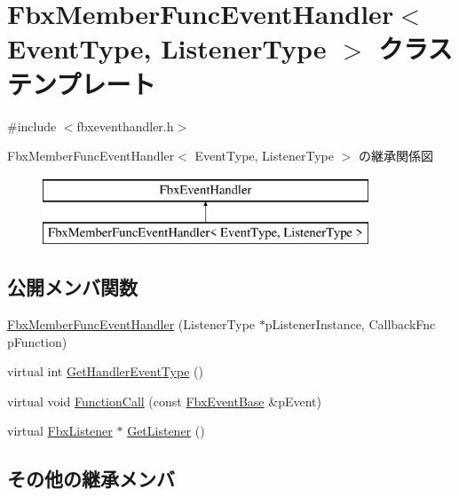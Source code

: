 \hypertarget{class_fbx_member_func_event_handler}{}\section{Fbx\+Member\+Func\+Event\+Handler$<$ Event\+Type, Listener\+Type $>$ クラステンプレート}
\label{class_fbx_member_func_event_handler}


{\ttfamily \#include $<$fbxeventhandler.\+h$>$}

Fbx\+Member\+Func\+Event\+Handler$<$ Event\+Type, Listener\+Type $>$ の継承関係図\begin{figure}[H]
\begin{center}
\leavevmode
\includegraphics[height=2.000000cm]{class_fbx_member_func_event_handler}
\end{center}
\end{figure}
\subsection*{公開メンバ関数}
\begin{DoxyCompactItemize}
\item 
\hyperlink{class_fbx_member_func_event_handler_aea54f8e7f5579f28f715c5a9b8e1e9d5}{Fbx\+Member\+Func\+Event\+Handler} (Listener\+Type $\ast$p\+Listener\+Instance, Callback\+Fnc p\+Function)
\item 
virtual int \hyperlink{class_fbx_member_func_event_handler_a57856423663f283503e6498a7eacb0b4}{Get\+Handler\+Event\+Type} ()
\item 
virtual void \hyperlink{class_fbx_member_func_event_handler_a4bcb037442927d480776bc2fb4b7bcd6}{Function\+Call} (const \hyperlink{class_fbx_event_base}{Fbx\+Event\+Base} \&p\+Event)
\item 
virtual \hyperlink{class_fbx_listener}{Fbx\+Listener} $\ast$ \hyperlink{class_fbx_member_func_event_handler_ad45db7b531f23f9e7776c93bec100668}{Get\+Listener} ()
\end{DoxyCompactItemize}
\subsection*{その他の継承メンバ}


